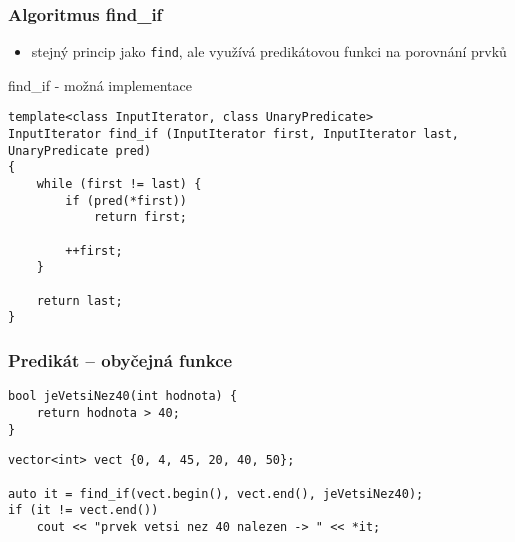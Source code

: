 \begin{frame}[fragile]
\frametitle{Algoritmus find\_if}

\begin{block}{}
\begin{itemize}
\item stejný princip jako \lstinline|find|, ale využívá predikátovou funkci na porovnání prvků
\end{itemize}
\end{block}
\end{frame}


\begin{frame}[fragile]
\begin{block}{find\_if - možná implementace}
\begin{lstlisting}
template<class InputIterator, class UnaryPredicate>
InputIterator find_if (InputIterator first, InputIterator last, UnaryPredicate pred)
{
	while (first != last) {
		if (pred(*first)) 
			return first;
			
		++first;
	}
	
	return last;
}	
\end{lstlisting}
\end{block}
\end{frame}


\begin{frame}[fragile]
\frametitle{Predikát -- obyčejná funkce}

\begin{yesblock}
\begin{lstlisting}
bool jeVetsiNez40(int hodnota) {
	return hodnota > 40;
}
\end{lstlisting}
\end{yesblock}

\begin{yesblock}
\begin{lstlisting}
vector<int> vect {0, 4, 45, 20, 40, 50};

auto it = find_if(vect.begin(), vect.end(), jeVetsiNez40);
if (it != vect.end()) 
	cout << "prvek vetsi nez 40 nalezen -> " << *it;
\end{lstlisting}
\end{yesblock}
\end{frame}

